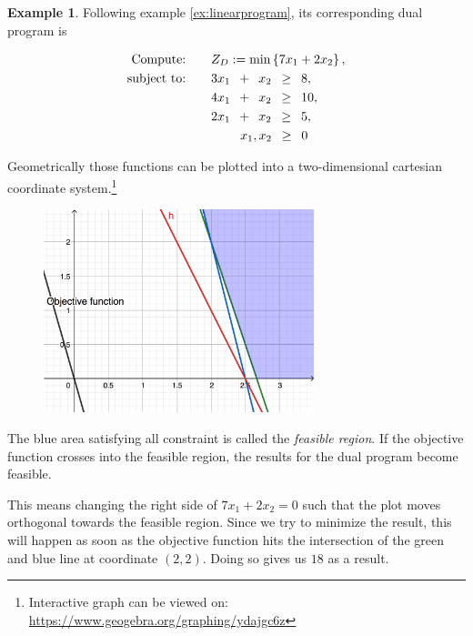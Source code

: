 \documentclass[10pt,a4paper,titlepage]{article}
\theoremstyle{plain}
\theoremstyle{definition}
\newtheorem{example}[thm]{Example} %
\begin{document}
\begin{example}\label{ex:linearprogramming2}
    Following example \ref{ex:linearprogram}, its corresponding dual program is\vspace{-20pt}

    \begin{alignat*}{1}
        \text{Compute:}\qquad& Z_D := \text{min}\left\{ 7x_1 + 2x_2 \right\},\\
        \text{subject to:}\qquad& 3x_1 \enskip + \enskip x_2 \enskip \geq \enskip 8,\\
        & 4x_1 \enskip + \enskip x_2 \enskip \geq \enskip 10,\\
        & 2x_1 \enskip + \enskip x_2 \enskip \geq \enskip 5,\\
        & \hspace{23pt} x_1, x_2 \enskip \geq \enskip 0
    \end{alignat*}

    Geometrically those functions can be plotted into a two-dimensional cartesian coordinate system.\footnote{Interactive graph can be viewed on: \url{https://www.geogebra.org/graphing/ydajgc6z}}

    \begin{figure}[h]
        \centering
        \includegraphics[width=0.7\textwidth]{img/dual_program}
    \end{figure}

    The blue area satisfying all constraint is called the \textit{feasible region}. If the objective function crosses into the feasible region, the results for the dual program become feasible.

    This means changing the right side of $7x_1 + 2x_2 = 0$ such that the plot moves orthogonal towards the feasible region. Since we try to minimize the result, this will happen as soon as the objective function hits the intersection of the green and blue line at coordinate $\left(2, 2\right)$. Doing so gives us $18$ as a result.
\end{example}
\end{document}
